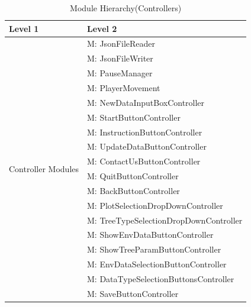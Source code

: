 \documentclass[12pt, titlepage]{article}
\newcounter{mnum}
\newcommand{\mthemnum}{M\themnum}
\begin{document}
\begin{table}[H]
\caption{Module Hierarchy(Controllers)}
\label{TblControllers}

\centering
\begin{tabular}{p{} p{}}
\toprule
\textbf{Level 1} & \textbf{Level 2}\\
\midrule

\multirow{18}{0.3\textwidth}{Controller Modules}
& {mnum} \mthemnum \label{Controller1}: JsonFileReader \\
& {mnum} \mthemnum \label{Controller2}: JsonFileWriter  \\
& {mnum} \mthemnum \label{Controller3}: PauseManager  \\
& {mnum} \mthemnum \label{Controller4}: PlayerMovement  \\
& {mnum} \mthemnum \label{Controller5}: NewDataInputBoxController\\
& {mnum} \mthemnum \label{Controller6}: StartButtonController  \\
& {mnum} \mthemnum \label{Controller7}: InstructionButtonController \\
& {mnum} \mthemnum \label{Controller8}: UpdateDataButtonController\\
& {mnum} \mthemnum \label{Controller9}: ContactUsButtonController \\
& {mnum} \mthemnum \label{Controller10}: QuitButtonController  \\
& {mnum} \mthemnum \label{Controller11}: BackButtonController \\
& {mnum} \mthemnum \label{Controller12}: PlotSelectionDropDownController \\
& {mnum} \mthemnum \label{Controller13}: TreeTypeSelectionDropDownController \\
& {mnum} \mthemnum \label{Controller14}: ShowEnvDataButtonController \\
& {mnum} \mthemnum \label{Controller15}: ShowTreeParamButtonController \\
& {mnum} \mthemnum \label{Controller16}: EnvDataSelectionButtonController\\
& {mnum} \mthemnum \label{Controller17}: DataTypeSelectionButtonsController \\
& {mnum} \mthemnum \label{Controller18}: SaveButtonController \\
\bottomrule

\end{tabular}

\end{table}
\end{document}
